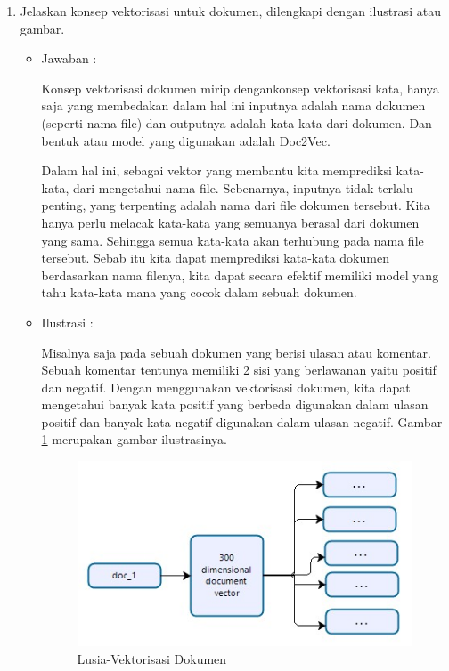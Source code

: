 \begin{enumerate}
\item Jelaskan konsep vektorisasi untuk dokumen, dilengkapi dengan ilustrasi atau
gambar.
	\begin{itemize}
	\item Jawaban :
		\par Konsep vektorisasi dokumen mirip dengankonsep vektorisasi kata, hanya saja yang membedakan dalam hal ini inputnya adalah nama dokumen (seperti nama file) dan outputnya adalah kata-kata dari dokumen. Dan bentuk atau model yang digunakan adalah Doc2Vec.
		\par Dalam hal ini, sebagai vektor yang membantu kita memprediksi kata-kata, dari mengetahui nama file. Sebenarnya, inputnya tidak terlalu penting, yang terpenting adalah nama dari file dokumen tersebut. Kita hanya perlu melacak kata-kata yang semuanya berasal dari dokumen yang sama. Sehingga semua kata-kata akan terhubung pada nama file tersebut. Sebab itu kita dapat memprediksi kata-kata dokumen berdasarkan nama filenya, kita dapat secara efektif memiliki model yang tahu kata-kata mana yang cocok dalam sebuah dokumen. 
	\item Ilustrasi :
		\par Misalnya saja pada sebuah dokumen yang berisi ulasan atau komentar. Sebuah komentar tentunya memiliki 2 sisi yang berlawanan yaitu positif dan negatif. Dengan menggunakan vektorisasi dokumen, kita dapat mengetahui banyak kata positif yang berbeda digunakan dalam ulasan positif dan banyak kata negatif digunakan dalam ulasan negatif. Gambar \ref{5a5} merupakan gambar ilustrasinya.
			\begin{figure}[!hbtp]
			\centering
			\includegraphics[scale=0.5]{figures/p4.jpg}
			\caption{Lusia-Vektorisasi Dokumen}
			\label{5a5}
			\end{figure}
	\end{itemize}


\end{enumerate}
